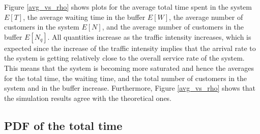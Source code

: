 \documentclass[12pt, a4paper]{article}
\begin{document}
Figure \ref{avg_vs_rho} shows plots for the average total time spent 
in the system $E[T]$, the average waiting time in  the buffer $E[W]$,
the average number of customers in the system $E[N]$, and the average 
number of customers in the buffer $E[N_q]$. All quantities increase as
the traffic intensity increases, which is expected since the increase 
of the traffic intensity implies that the arrival rate to the system is 
getting relatively close to the overall service rate of the system. This means 
that the system is becoming more saturated and hence the averages for 
the total time, the waiting time, and the total number of customers
in the system and in the buffer increase. Furthermore, Figure \ref{avg_vs_rho} 
shows that the simulation results agree with the theoretical ones.

\subsection{PDF of the total time}
\end{document}

